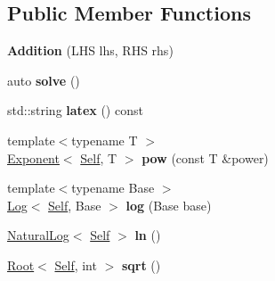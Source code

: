\subsection*{Public Member Functions}
\begin{DoxyCompactItemize}
\item 
\hypertarget{classlatex_1_1math_1_1Addition_ade3a2eff41f8aaef8f77c2b2bb238b57}{{\bfseries Addition} (L\-H\-S lhs, R\-H\-S rhs)}\label{classlatex_1_1math_1_1Addition_ade3a2eff41f8aaef8f77c2b2bb238b57}

\item 
\hypertarget{classlatex_1_1math_1_1Addition_a69f19bb11a63d8631b6e0d246b994c00}{auto {\bfseries solve} ()}\label{classlatex_1_1math_1_1Addition_a69f19bb11a63d8631b6e0d246b994c00}

\item 
\hypertarget{classlatex_1_1math_1_1Addition_a03c226a26292f1203370bedf162731a0}{std\-::string {\bfseries latex} () const }\label{classlatex_1_1math_1_1Addition_a03c226a26292f1203370bedf162731a0}

\item 
\hypertarget{classlatex_1_1math_1_1Addition_aeb8aded4d72c95ac93539860321f2d0b}{{\footnotesize template$<$typename T $>$ }\\\hyperlink{classlatex_1_1math_1_1Exponent}{Exponent}$<$ \hyperlink{classlatex_1_1math_1_1Addition}{Self}, T $>$ {\bfseries pow} (const T \&power)}\label{classlatex_1_1math_1_1Addition_aeb8aded4d72c95ac93539860321f2d0b}

\item 
\hypertarget{classlatex_1_1math_1_1Addition_aeafa689b3df0a4c99396c3f5d12d40a5}{{\footnotesize template$<$typename Base $>$ }\\\hyperlink{classlatex_1_1math_1_1Log}{Log}$<$ \hyperlink{classlatex_1_1math_1_1Addition}{Self}, Base $>$ {\bfseries log} (Base base)}\label{classlatex_1_1math_1_1Addition_aeafa689b3df0a4c99396c3f5d12d40a5}

\item 
\hypertarget{classlatex_1_1math_1_1Addition_adf1963ebf74f64325555149dcefaf30a}{\hyperlink{classlatex_1_1math_1_1NaturalLog}{Natural\-Log}$<$ \hyperlink{classlatex_1_1math_1_1Addition}{Self} $>$ {\bfseries ln} ()}\label{classlatex_1_1math_1_1Addition_adf1963ebf74f64325555149dcefaf30a}

\item 
\hypertarget{classlatex_1_1math_1_1Addition_a8c94bab6a8b94636f0a1215d8690f273}{\hyperlink{classlatex_1_1math_1_1Root}{Root}$<$ \hyperlink{classlatex_1_1math_1_1Addition}{Self}, int $>$ {\bfseries sqrt} ()}\label{classlatex_1_1math_1_1Addition_a8c94bab6a8b94636f0a1215d8690f273}

\end{DoxyCompactItemize}
